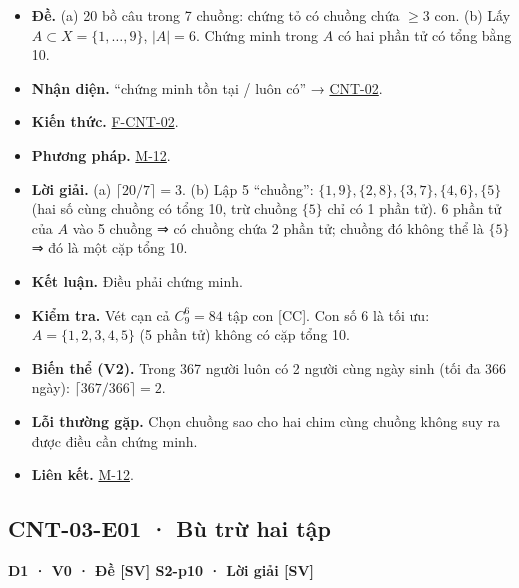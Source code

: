 \documentclass[
  10pt,
  twoside,openany]{book}
\providecommand{\tightlist}{%
  \setlength{\itemsep}{0pt}\setlength{\parskip}{0pt}}
\begin{document}
\begin{itemize}
\tightlist
\item
  \textbf{Đề.} (a) 20 bồ câu trong 7 chuồng: chứng tỏ có chuồng chứa
  \(\ge3\) con. (b) Lấy \(A\subset X=\{1,\dots,9\}\), \(|A|=6\). Chứng
  minh trong \(A\) có hai phần tử có tổng bằng 10.
\item
  \textbf{Nhận diện.} ``chứng minh tồn tại / luôn có'' →
  \protect\hyperlink{CNT-02}{CNT-02}.
\item
  \textbf{Kiến thức.} \protect\hyperlink{F-CNT-02}{F-CNT-02}.
\item
  \textbf{Phương pháp.} \protect\hyperlink{M-12}{M-12}.
\item
  \textbf{Lời giải.} (a) \(\lceil20/7\rceil=3\). (b) Lập 5 ``chuồng'':
  \(\{1,9\},\{2,8\},\{3,7\},\{4,6\},\{5\}\) (hai số cùng chuồng có tổng
  10, trừ chuồng \(\{5\}\) chỉ có 1 phần tử). 6 phần tử của \(A\) vào 5
  chuồng ⇒ có chuồng chứa 2 phần tử; chuồng đó không thể là \(\{5\}\) ⇒
  đó là một cặp tổng 10.
\item
  \textbf{Kết luận.} Điều phải chứng minh.
\item
  \textbf{Kiểm tra.} Vét cạn cả \(C_9^6=84\) tập con {[}CC{]}. Con số 6
  là tối ưu: \(A=\{1,2,3,4,5\}\) (5 phần tử) không có cặp tổng 10.
\item
  \textbf{Biến thể (V2).} Trong 367 người luôn có 2 người cùng ngày sinh
  (tối đa 366 ngày): \(\lceil367/366\rceil=2\).
\item
  \textbf{Lỗi thường gặp.} Chọn chuồng sao cho hai chim cùng chuồng
  không suy ra được điều cần chứng minh.
\item
  \textbf{Liên kết.} \protect\hyperlink{M-12}{M-12}.
\end{itemize}

\hypertarget{CNT-03-E01}{%
\subsection{CNT-03-E01 · Bù trừ hai tập}\label{CNT-03-E01}}

\textbf{D1 · V0 · Đề {[}SV{]} S2-p10 · Lời giải {[}SV{]}}
\end{document}
